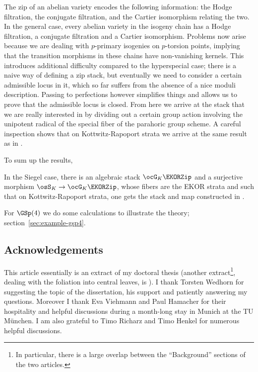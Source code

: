 \documentclass[a4paper]{scrartcl} %
\numberwithin{equation}{section}
\begin{document}
The zip of an abelian variety encodes the following information: the Hodge filtration, the conjugate filtration, and the Cartier isomorphism relating the two. In the general case, every abelian variety in the isogeny chain has a Hodge filtration, a conjugate filtration and a Cartier isomorphism. Problems now arise because we are dealing with $p$-primary isogenies on $p$-torsion points, implying that the transition morphisms in these chains have non-vanishing kernels.  This introduces additional difficulty compared to the hyperspecial case; there is a naive way of defining a zip stack, but eventually we need to consider a certain admissible locus in it, which so far suffers from the absence of a nice moduli description.  Passing to perfections however simplifies things and allows us to prove that the admissible locus is closed.  From here we arrive at the stack that we are really interested in by dividing out a certain group action involving the unipotent radical of the special fiber of the parahoric group scheme.  A careful inspection shows that on Kottwitz-Rapoport strata we arrive at the same result  as in \cite{SYZnew}.

To sum up the results,
\begin{TheoremA}
  In the Siegel case, there is an algebraic stack $\ocG_K\EKORZip$ and a        surjective         morphism $\osS_K \to \ocG_K\EKORZip$, whose fibers are the EKOR strata and such that on Kottwitz-Rapoport strata, one gets the stack and map constructed in \cite{SYZnew}.
\end{TheoremA}

For $\GSp(4)$ we do some calculations to illustrate the theory; section~\ref{sec:example-gsp4}.

\subsection*{Acknowledgements}

This article essentially is an extract of my doctoral thesis \cite{diss} (another extract\footnote{In particular, there is a large overlap between the ``Background'' sections of the two articles.}, dealing with the foliation into central leaves, is \cite{article-leaves}). I thank Torsten Wedhorn for suggesting the topic of the dissertation, his support and patiently answering my questions.
Moreover I thank Eva Viehmann and Paul Hamacher for their hospitality and helpful discussions during a month-long stay in Munich at the TU M\"unchen.
I am also grateful to Timo Richarz and Timo Henkel
for numerous helpful discussions.
\end{document}
